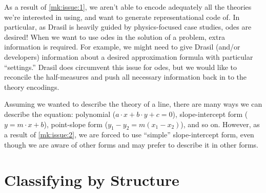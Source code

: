 As a result of \ref{mk:issue:1}, we aren't able to encode adequately all the
theories we're interested in using, and want to generate representational code
of. In particular, as Drasil is heavily guided by physics-focused case studies,
\acsp{ode} are desired! When we want to use \acsp{ode} in the solution of a
problem, extra information is required. For example, we might need to give
Drasil (and/or developers) information about a desired approximation formula
with particular ``settings.'' Drasil does circumvent this issue for \acsp{ode},
but we would like to reconcile the half-measures and push all necessary
information back in to the theory encodings.

Assuming we wanted to describe the theory of a line, there are many ways we can
describe the equation: polynomial (\(a \cdot{} x + b \cdot{} y + c = 0\)),
slope-intercept form (\(y = m \cdot{} x + b\)), point-slope form (\(y_1 - y_2 =
m(x_1 - x_2)\)), and so on. However, as a result of \ref{mk:issue:2}, we are
forced to use ``simple'' slope-intercept form, even though we are aware of other
forms and may prefer to describe it in other forms.


\section{Classifying by Structure}
\label{chap:framing-theories:sec:classifying-and-structuring}


